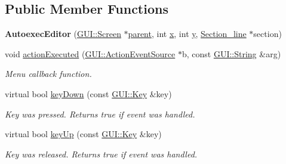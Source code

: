 \subsection*{Public Member Functions}
\begin{DoxyCompactItemize}
\item 
\hypertarget{classAutoexecEditor_ae2c55e6e3715432d9c394f1dec2f4255}{{\bfseries Autoexec\-Editor} (\hyperlink{classGUI_1_1Screen}{G\-U\-I\-::\-Screen} $\ast$\hyperlink{classGUI_1_1Window_a2e593ff65e7702178d82fe9010a0b539}{parent}, int \hyperlink{classGUI_1_1Window_a6ca6a80ca00c9e1d8ceea8d3d99a657d}{x}, int \hyperlink{classGUI_1_1Window_a0ee8e923aff2c3661fc2e17656d37adf}{y}, \hyperlink{classSection__line}{Section\-\_\-line} $\ast$section)}\label{classAutoexecEditor_ae2c55e6e3715432d9c394f1dec2f4255}

\item 
\hypertarget{classAutoexecEditor_a5103a2bb5e750230a808ce091448ed05}{void \hyperlink{classAutoexecEditor_a5103a2bb5e750230a808ce091448ed05}{action\-Executed} (\hyperlink{classGUI_1_1ActionEventSource}{G\-U\-I\-::\-Action\-Event\-Source} $\ast$b, const \hyperlink{classGUI_1_1String}{G\-U\-I\-::\-String} \&arg)}\label{classAutoexecEditor_a5103a2bb5e750230a808ce091448ed05}

\begin{DoxyCompactList}\small\item\em Menu callback function. \end{DoxyCompactList}\item 
\hypertarget{classAutoexecEditor_ac0720e029f17584c845af698f3c72ceb}{virtual bool \hyperlink{classAutoexecEditor_ac0720e029f17584c845af698f3c72ceb}{key\-Down} (const \hyperlink{classGUI_1_1Key}{G\-U\-I\-::\-Key} \&key)}\label{classAutoexecEditor_ac0720e029f17584c845af698f3c72ceb}

\begin{DoxyCompactList}\small\item\em Key was pressed. Returns true if event was handled. \end{DoxyCompactList}\item 
\hypertarget{classAutoexecEditor_a6c9f4c06e4f6e8e92f6d40e4b0d0eec6}{virtual bool \hyperlink{classAutoexecEditor_a6c9f4c06e4f6e8e92f6d40e4b0d0eec6}{key\-Up} (const \hyperlink{classGUI_1_1Key}{G\-U\-I\-::\-Key} \&key)}\label{classAutoexecEditor_a6c9f4c06e4f6e8e92f6d40e4b0d0eec6}

\begin{DoxyCompactList}\small\item\em Key was released. Returns true if event was handled. \end{DoxyCompactList}\end{DoxyCompactItemize}
